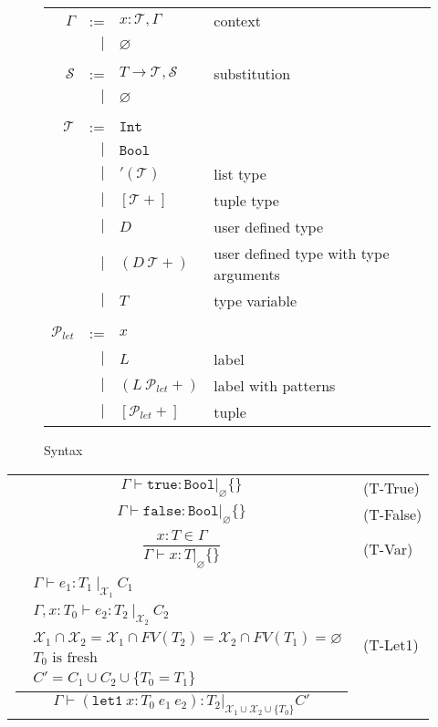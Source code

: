 \documentclass{article}
\begin{document}
\begin{figure}
    \centering
    \begin{tabular}{rrll}
    $\Gamma$ & :=  & $x : \mathcal{T}, \Gamma$ & context\\
        & $|$ & $\varnothing$ \\ \\

    $\mathcal{S}$ & :=  & $T \rightarrow \mathcal{T}, \mathcal{S}$ & substitution \\
        & $|$ & $\varnothing$ \\ \\

    $\mathcal{T}$ & :=  & $\mathtt{Int}$ \\
        & $|$ & $\mathtt{Bool}$ \\
        & $|$ & $'(\mathcal{T})$ & list type \\
        & $|$ & $[\mathcal{T}+]$ & tuple type \\
        & $|$ & $D$    & user defined type \\
        & $|$ & $(D\ \mathcal{T}+)$ & user defined type with type arguments \\
        & $|$ & $T$ & type variable \\ \\

    $\mathcal{P}_{let}$ & :=  & $x$ \\
        & $|$ & $L$ & label \\
        & $|$ & $(L\ \mathcal{P}_{let}+)$ & label with patterns \\
        & $|$ & $[\mathcal{P}_{let}+]$ & tuple \\
    \end{tabular}
    \caption{Syntax}
\end{figure}

\begin{tabular}{cl}
$\Gamma \vdash \mathtt{true} : \mathtt{Bool} |_\varnothing \{\}$ & (T-True) \\
$\Gamma \vdash \mathtt{false} : \mathtt{Bool} |_\varnothing \{\}$ & (T-False) \\
$\dfrac{x : T \in \Gamma}{\Gamma \vdash x : T |_\varnothing \{\}}$ & (T-Var) \\
$\dfrac{\begin{aligned}
&\Gamma \vdash e_1 : T_1\ |_{\mathcal{X}_1}\ C_1\\
&\Gamma, x : T_0 \vdash e_2 : T_2\ |_{\mathcal{X}_2}\ C_2\\
&\mathcal{X}_1 \cap \mathcal{X}_2 = \mathcal{X}_1 \cap FV(T_2) = \mathcal{X}_2 \cap FV(T_1) = \varnothing\\
&T_0 \mbox{ is fresh} \\
&C' = C_1 \cup C_2 \cup \{ T_0 = T_1 \}
\end{aligned}}{\Gamma \vdash (\mathtt{let1}\ x : T_0\ e_1\ e_2) : T_2 |_{\mathcal{X}_1 \cup \mathcal{X}_2 \cup \{T_0\}} C'}$ & (T-Let1)
\end{tabular}
\end{document}
